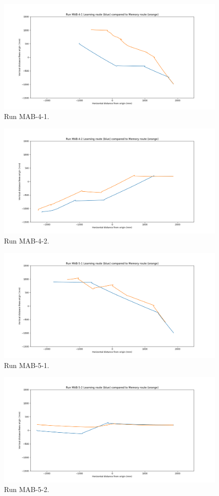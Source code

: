 \documentclass[a4paper,12pt,twoside,openright]{article}
\begin{document}
\begin{figure}[h!]
 \centering
  \includegraphics[width=\textwidth]{MAB-4-1}
  \caption{
    \label{fig:mab-4-1} Run MAB-4-1.
  }
\end{figure}

\begin{figure}[h!]
 \centering
  \includegraphics[width=\textwidth]{MAB-4-2}
  \caption{
    \label{fig:mab-4-2} Run MAB-4-2.
  }
\end{figure}

\begin{figure}[h!]
 \centering
  \includegraphics[width=\textwidth]{MAB-5-1}
  \caption{
    \label{fig:mab-5-1} Run MAB-5-1.
  }
\end{figure}

\begin{figure}[h!]
 \centering
  \includegraphics[width=\textwidth]{MAB-5-2-S}
  \caption{
    \label{fig:mab-5-2} Run MAB-5-2.
  }
\end{figure}
\end{document}
